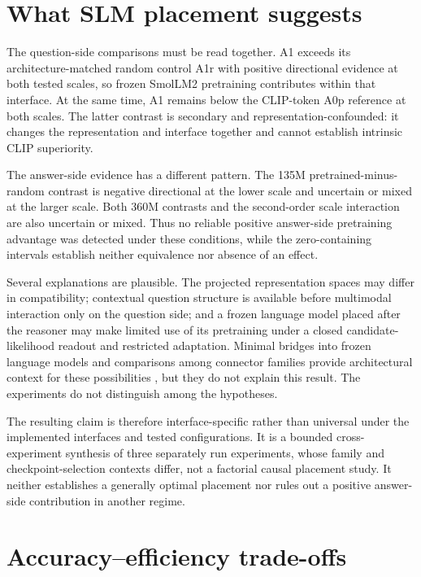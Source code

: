 \section{What SLM placement suggests}
\label{sec:ch8-placement}

The question-side comparisons must be read together. A1 exceeds its
architecture-matched random control A1r with positive directional evidence at
both tested scales, so frozen SmolLM2 pretraining contributes within that
interface. At the same time, A1 remains below the CLIP-token A0p reference at
both scales. The latter contrast is secondary and representation-confounded:
it changes the representation and interface together and cannot establish
intrinsic CLIP superiority.

The answer-side evidence has a different pattern. The 135M
pretrained-minus-random contrast is negative directional at the lower scale and uncertain or
mixed at the larger scale. Both 360M contrasts and the second-order scale
interaction are also uncertain or mixed. Thus no reliable positive
answer-side pretraining advantage was detected under these conditions, while
the zero-containing intervals establish neither equivalence nor absence of an
effect.

Several explanations are plausible. The projected representation spaces may
differ in compatibility; contextual question structure is available before
multimodal interaction only on the question side; and a frozen language model
placed after the reasoner may make limited use of its pretraining under a
closed candidate-likelihood readout and restricted adaptation. Minimal bridges
into frozen language models and comparisons among connector families provide
architectural context for these possibilities
\citep{merullo2023limber,vallaeys2024depalm}, but they do not explain this
result. The experiments do not distinguish among the hypotheses.

The resulting claim is therefore interface-specific rather than universal
under the implemented interfaces and tested configurations. It is a bounded
cross-experiment synthesis of three separately run experiments, whose family
and checkpoint-selection contexts differ, not a factorial causal placement
study. It neither establishes a generally optimal placement nor rules out a
positive answer-side contribution in another regime.

\section{Accuracy--efficiency trade-offs}
\label{sec:ch8-efficiency}


